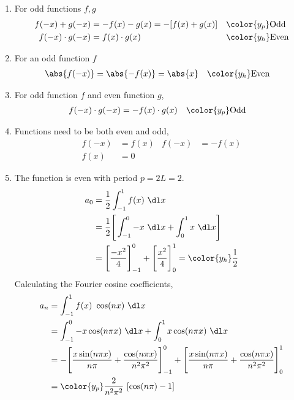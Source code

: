 \begin{enumerate}
    \item For odd functions $ f, g $
          \begin{align}
              f(-x) + g(-x)     & = -f(x) - g(x) = - [f(x) + g(x)] &
                                & \color{y_p} \text{Odd}             \\
              f(-x) \cdot g(-x) & = f(x) \cdot g(x)                &
                                & \color{y_h} \text{Even}
          \end{align}

    \item For an odd function $ f $
          \begin{align}
              \abs{f(-x)} & = \abs{-f(x)} = \abs{x} &
                          & \color{y_h} \text{Even}
          \end{align}

    \item For odd function $ f $ and even function $ g $,
          \begin{align}
              f(-x) \cdot g(-x) & = -f(x) \cdot g(x)     &
                                & \color{y_p} \text{Odd}
          \end{align}

    \item Functions need to be both even and odd,
          \begin{align}
              f(-x) & = f(x)  &
              f(-x) & = -f(x)   \\
              f(x)  & = 0
          \end{align}

    \item The function is even with period $ p = 2L = 2 $.
          \begin{align}
              a_0 & = \frac{1}{2} \int_{-1}^{1} f(x)\ \dl x     \\
                  & = \frac{1}{2} \Bigg[\int_{-1}^{0} -x\ \dl x
              + \int_{0}^{1} x\ \dl x\Bigg]                     \\
                  & = \Bigg[ \frac{-x^2}{4} \Bigg]_{-1}^{0}
              + \Bigg[ \frac{x^2}{4} \Bigg]_{0}^{1} = \color{y_h} \frac{1}{2}
          \end{align}
          Calculating the Fourier cosine coefficients,
          \begin{align}
              a_n & = \int_{-1}^{1} f(x)\ \cos(nx)\ \dl x              \\
                  & = \int_{-1}^{0} -x \cos(n\pi x)\ \dl x
              + \int_{0}^{1} x \cos(n\pi x)\ \dl x                     \\
                  & = -\Bigg[ \frac{x\sin(n\pi x)}{n\pi}
                  + \frac{\cos(n\pi x)}{n^2\pi^2} \Bigg]_{-1}^{0}
              + \Bigg[ \frac{x\sin(n\pi x)}{n\pi}
              + \frac{\cos(n\pi x)}{n^2\pi^2} \Bigg]_{0}^{1}           \\
                  & = \color{y_p} \frac{2}{n^2\pi^2}\ [\cos(n\pi) - 1]
          \end{align}


\end{enumerate}
